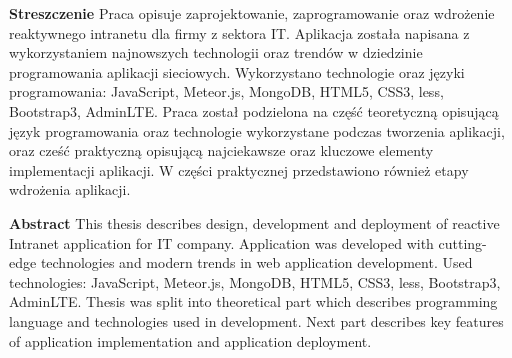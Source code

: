 \noindent\textbf{Streszczenie}\newline
Praca opisuje zaprojektowanie, zaprogramowanie oraz wdrożenie reaktywnego intranetu dla firmy z sektora IT. Aplikacja została napisana z wykorzystaniem najnowszych technologii oraz trendów w dziedzinie programowania aplikacji sieciowych. Wykorzystano technologie oraz języki programowania: JavaScript, Meteor.js, MongoDB, HTML5, CSS3, less, Bootstrap3, AdminLTE. Praca został podzielona na część teoretyczną opisującą język programowania oraz technologie wykorzystane podczas tworzenia aplikacji, oraz cześć praktyczną opisującą najciekawsze oraz kluczowe elementy implementacji aplikacji. W części praktycznej przedstawiono również etapy wdrożenia aplikacji.
\vspace{1cm}

\noindent\textbf{Abstract}\newline
This thesis describes design, development and deployment of reactive Intranet application for IT company. Application was developed with cutting-edge technologies and modern trends in web application development. Used technologies: JavaScript, Meteor.js, MongoDB, HTML5, CSS3, less, Bootstrap3, AdminLTE. Thesis was split into theoretical part which describes programming language and technologies used in development. Next part describes key features of application implementation and application deployment.